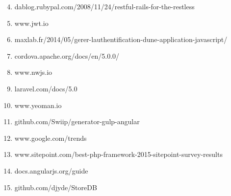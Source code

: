 \documentclass[12pt, ChapStyle1, oneside]{./Styles/Dea_Gsm}
\begin{document}
\large
\vspace{6mm}
\begin{enumerate}
    \setcounter{enumi}{3}
    \item dablog.rubypal.com/2008/11/24/restful-rails-for-the-restless
    
    \item www.jwt.io
    \item maxlab.fr/2014/05/gerer-lauthentification-dune-application-javascript/

    \item cordova.apache.org/docs/en/5.0.0/
    \item www.nwjs.io

    
    \item laravel.com/docs/5.0

    \item www.yeoman.io
    \item github.com/Swiip/generator-gulp-angular
    \item www.google.com/trends
    \item www.sitepoint.com/best-php-framework-2015-sitepoint-survey-results
    \item docs.angularjs.org/guide
    \item github.com/djyde/StoreDB
    

\end{enumerate}
\end{document}
